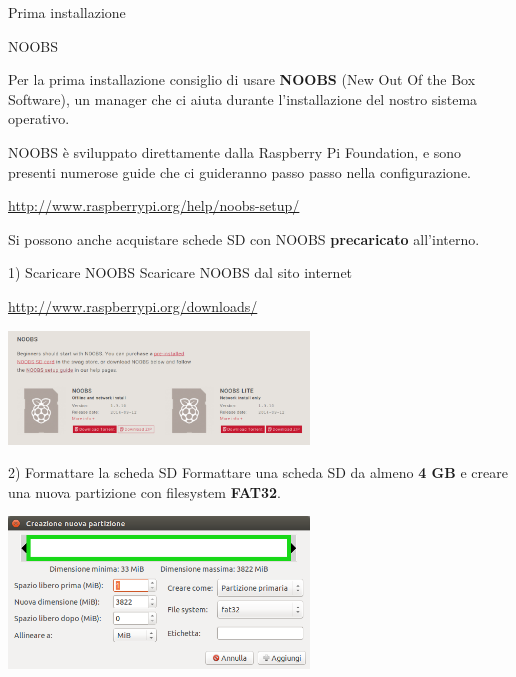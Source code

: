 \documentclass[xcolor=svgnames,11pt]{beamer}
\begin{document}
\begin{frame}{Prima installazione}
\begin{block}{NOOBS}

Per la prima installazione consiglio di usare \textbf{NOOBS} (New Out Of the Box Software), un manager che ci aiuta durante l'installazione del nostro sistema operativo.

\end{block}

\pause
\medskip

NOOBS \`e sviluppato direttamente dalla Raspberry Pi Foundation, e sono presenti numerose guide che ci guideranno passo passo nella configurazione.

\pause
\medskip
\begin{center}
\url{http://www.raspberrypi.org/help/noobs-setup/}
\end{center}

\pause
\medskip

Si possono anche acquistare schede SD con NOOBS \textbf{precaricato} all'interno.

\end{frame}

\begin{frame}{1) Scaricare NOOBS}
Scaricare NOOBS dal sito internet
\begin{center}
\url{http://www.raspberrypi.org/downloads/}

\bigskip
\includegraphics[width=8cm]{guide/1.png}

\end{center}
\end{frame}

\begin{frame}{2) Formattare la scheda SD}
Formattare una scheda SD da almeno \textbf{4 GB} e creare una nuova partizione con filesystem \textbf{FAT32}.

\bigskip
\begin{center}
\includegraphics[width=8cm]{guide/2.png}
\end{center}
\end{frame}
\end{document}
